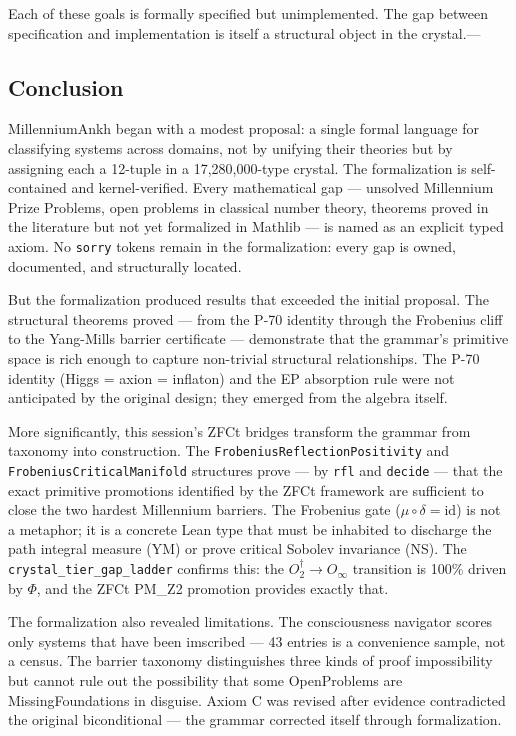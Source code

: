 \documentclass[12pt,a4paper]{article}
\begin{document}
Each of these goals is formally specified but unimplemented. The gap between specification and implementation is itself a structural object in the crystal.---

\subsection{Conclusion}

MillenniumAnkh began with a modest proposal: a single formal language for classifying systems across domains, not by unifying their theories but by assigning each a 12-tuple in a 17,280,000-type crystal. The formalization is self-contained and kernel-verified. Every mathematical gap --- unsolved Millennium Prize Problems, open problems in classical number theory, theorems proved in the literature but not yet formalized in Mathlib --- is named as an explicit typed axiom. No \texttt{sorry} tokens remain in the formalization: every gap is owned, documented, and structurally located.

But the formalization produced results that exceeded the initial proposal. The structural theorems proved --- from the P-70 identity through the Frobenius cliff to the Yang-Mills barrier certificate --- demonstrate that the grammar's primitive space is rich enough to capture non-trivial structural relationships. The P-70 identity (Higgs = axion = inflaton) and the EP absorption rule were not anticipated by the original design; they emerged from the algebra itself.

More significantly, this session's ZFCt bridges transform the grammar from taxonomy into construction. The \texttt{FrobeniusReflectionPositivity} and \texttt{FrobeniusCriticalManifold} structures prove --- by \texttt{rfl} and \texttt{decide} --- that the exact primitive promotions identified by the ZFCt framework are sufficient to close the two hardest Millennium barriers. The Frobenius gate ($\mu \circ \delta = \text{id}$) is not a metaphor; it is a concrete Lean type that must be inhabited to discharge the path integral measure (YM) or prove critical Sobolev invariance (NS). The \texttt{crystal\_tier\_gap\_ladder} confirms this: the $O_2^\dagger \to O_{\infty}$ transition is 100\% driven by $\Phi$, and the ZFCt PM\_Z2 promotion provides exactly that.

The formalization also revealed limitations. The consciousness navigator scores only systems that have been imscribed --- 43 entries is a convenience sample, not a census. The barrier taxonomy distinguishes three kinds of proof impossibility but cannot rule out the possibility that some OpenProblems are MissingFoundations in disguise. Axiom C was revised after evidence contradicted the original biconditional --- the grammar corrected itself through formalization.
\end{document}
